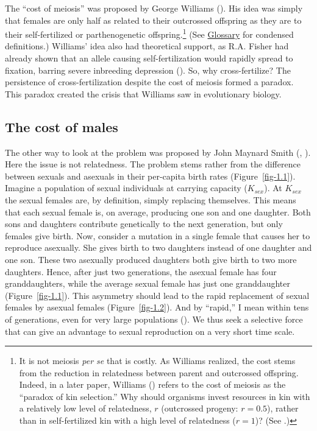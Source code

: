 \documentclass[
  letterpaper,
]{book}
\begin{document}
The ``cost of meiosis'' was proposed by George Williams
(). His idea was simply that females
are only half as related to their outcrossed offspring as they are to
their self-fertilized or parthenogenetic offspring.\footnote{It is not
  meiosis \emph{per se} that is costly. As Williams realized, the cost
  stems from the reduction in relatedness between parent and outcrossed
  offspring. Indeed, in a later paper, Williams
  () refers to the cost of meiosis as
  the ``paradox of kin selection.'' Why should organisms invest
  resources in kin with a relatively low level of relatedness, \(r\)
  (outcrossed progeny: \(r = 0.5\)), rather than in self-fertilized kin
  with a high level of relatedness (\(r = 1\))? (See
  .)} (See
\hyperref[sec-glossary]{Glossary} for condensed definitions.) Williams'
idea also had theoretical support, as R.A. Fisher had already shown that
an allele causing self-fertilization would rapidly spread to fixation,
barring severe inbreeding depression ().
So, why cross-fertilize? The persistence of cross-fertilization despite
the cost of meiosis formed a paradox. This paradox created the crisis
that Williams saw in evolutionary biology.

\subsection{The cost of males}\label{the-cost-of-males}

The other way to look at the problem was proposed by John Maynard Smith
(, ).
Here the issue is not relatedness. The problem stems rather from the
difference between sexuals and asexuals in their per-capita birth rates
(Figure~\ref{fig-1.1}). Imagine a population of sexual individuals at
carrying capacity (\(K_{sex}\)). At \(K_{sex}\) the sexual females are,
by definition, simply replacing themselves. This means that each sexual
female is, on average, producing one son and one daughter. Both sons and
daughters contribute genetically to the next generation, but only
females give birth. Now, consider a mutation in a single female that
causes her to reproduce asexually. She gives birth to two daughters
instead of one daughter and one son. These two asexually produced
daughters both give birth to two more daughters. Hence, after just two
generations, the asexual female has four granddaughters, while the
average sexual female has just one granddaughter (Figure~\ref{fig-1.1}).
This asymmetry should lead to the rapid replacement of sexual females by
asexual females (Figure~\ref{fig-1.2}). And by ``rapid,'' I mean within
tens of generations, even for very large populations
(). We thus seek a selective
force that can give an advantage to sexual reproduction on a very short
time scale.
\end{document}
